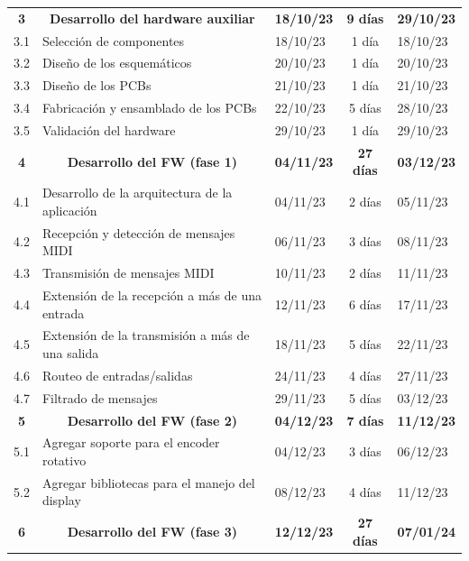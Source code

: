 \documentclass[
11pt, %
]{charter}
\begin{document}
\begin{longtable}[c]{|cllcl|}
	\rowcolor[HTML]{ECF4FF} 
	\textbf{3} & \multicolumn{1}{c}{\cellcolor[HTML]{ECF4FF}\textbf{Desarrollo del hardware auxiliar}} & \textbf{18/10/23} & \textbf{9 días} & \textbf{29/10/23} \\
	3.1 & Selección de componentes & 18/10/23 & 1 día & 18/10/23 \\
	\rowcolor[HTML]{EFEFEF} 
	3.2 & Diseño de los esquemáticos & 20/10/23 & 1 día & 20/10/23 \\
	3.3 & Diseño de los PCBs & 21/10/23 & 1 día & 21/10/23 \\
	\rowcolor[HTML]{EFEFEF} 
	3.4 & Fabricación y ensamblado de los PCBs & 22/10/23 & 5 días & 28/10/23 \\
	3.5 & Validación del hardware & 29/10/23 & 1 día & 29/10/23 \\
	\rowcolor[HTML]{ECF4FF} 
	\textbf{4} & \multicolumn{1}{c}{\cellcolor[HTML]{ECF4FF}\textbf{Desarrollo del FW (fase 1)}} & \textbf{04/11/23} & \textbf{27 días} & \textbf{03/12/23} \\
	4.1 & Desarrollo de la arquitectura de la aplicación & 04/11/23 & 2 días & 05/11/23 \\
	\rowcolor[HTML]{EFEFEF} 
	4.2 & Recepción y detección de mensajes  MIDI & 06/11/23 & 3 días & 08/11/23 \\
	4.3 & Transmisión de mensajes MIDI & 10/11/23 & 2 días & 11/11/23 \\
	\rowcolor[HTML]{EFEFEF} 
	4.4 & Extensión de la recepción a más de una entrada & 12/11/23 & 6 días & 17/11/23 \\
	4.5 & Extensión de la transmisión a más de una salida & 18/11/23 & 5 días & 22/11/23 \\
	\rowcolor[HTML]{EFEFEF} 
	4.6 & Routeo de entradas/salidas & 24/11/23 & 4 días & 27/11/23 \\
	4.7 & Filtrado de mensajes & 29/11/23 & 5 días & 03/12/23 \\
	\rowcolor[HTML]{ECF4FF} 
	\textbf{5} & \multicolumn{1}{c}{\cellcolor[HTML]{ECF4FF}\textbf{Desarrollo del FW (fase 2)}} & \textbf{04/12/23} & \textbf{7 días} & \textbf{11/12/23} \\
	5.1 & Agregar soporte para el encoder rotativo & 04/12/23 & 3 días & 06/12/23 \\
	\rowcolor[HTML]{EFEFEF} 
	5.2 & Agregar bibliotecas para el manejo del display & 08/12/23 & 4 días & 11/12/23 \\
	\rowcolor[HTML]{ECF4FF} 
	\textbf{6} & \multicolumn{1}{c}{\cellcolor[HTML]{ECF4FF}\textbf{Desarrollo del FW (fase 3)}} & \textbf{12/12/23} & \textbf{27 días} & \textbf{07/01/24} \\

\end{longtable}
\end{document}
